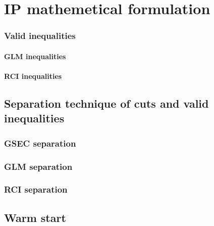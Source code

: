 \chapter{IP mathemetical formulation}

\subsection{Valid inequalities}

\subsubsection{GLM inequalities}

\subsubsection{RCI inequalities}


\section{Separation technique of cuts and valid inequalities}

\subsection{GSEC separation}

\subsection{GLM separation}

\subsection{RCI separation}

\section{Warm start}
